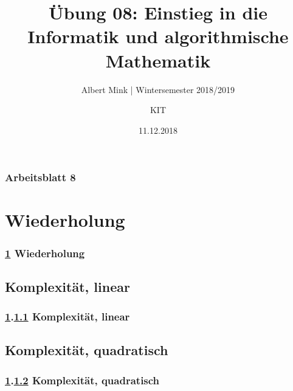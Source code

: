 \documentclass[c,18pt]{beamer}
\date{11.12.2018}
\title[Übung 08: Einstieg in die Informatik und algorithmische Mathematik]
  {Übung 08: Einstieg in die Informatik und algorithmische Mathematik}
\subtitle{Albert Mink | Wintersemester 2018/2019}
\author[Albert Mink, ]{KIT}
\institute[Institut für Angewandte und Numerische Mathematik (IANM)]{Institut für Angewandte und Numerische Mathematik}
\begin{document}
\begin{frame}
  \maketitle
\end{frame}

\begin{frame}
  \frametitle{Arbeitsblatt 8}%
\tableofcontents
\end{frame}


\section{Wiederholung}\label{K:wdh}
\begin{frame}
  \frametitle{\ref{K:wdh} Wiederholung}%
\tableofcontents[current]
\end{frame}

\def\stitle{Komplexit\"at, linear}
\subsection{\stitle}\label{S:Lin}
\begin{frame}[t]%
  \frametitle{\ref{K:wdh}.\ref{S:Lin} \stitle}
\medskip




\end{frame}


\def\stitle{Komplexit\"at, quadratisch}
\subsection{\stitle}\label{S:Quad}
\begin{frame}[t]%
  \frametitle{\ref{K:wdh}.\ref{S:Quad} \stitle}
\medskip


\end{frame}
\end{document}
